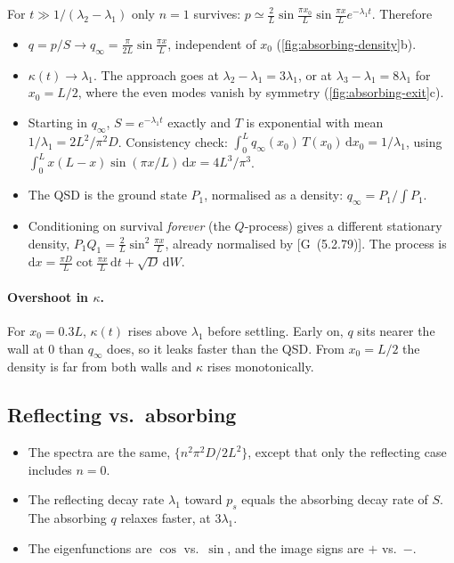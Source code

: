 \documentclass[11pt]{article}
\numberwithin{equation}{section}
\newcommand{\dd}{\mathrm{d}}
\newcommand{\G}[1]{[G~(#1)]}
\begin{document}
For $t\gg1/(\lambda_2-\lambda_1)$ only $n=1$ survives:
$p\simeq\frac2L\sin\frac{\pi x_0}{L}\sin\frac{\pi x}{L}e^{-\lambda_1t}$. Therefore
\begin{itemize}
  \item $q=p/S\to q_\infty=\frac{\pi}{2L}\sin\frac{\pi x}{L}$, independent of $x_0$ (\cref{fig:absorbing-density}b).
  \item $\kappa(t)\to\lambda_1$. The approach goes at $\lambda_2-\lambda_1=3\lambda_1$, or at
        $\lambda_3-\lambda_1=8\lambda_1$ for $x_0=L/2$, where the even modes vanish by symmetry
        (\cref{fig:absorbing-exit}c).
  \item Starting in $q_\infty$, $S=e^{-\lambda_1t}$ exactly and $T$ is exponential with mean
        $1/\lambda_1=2L^2/\pi^2D$. Consistency check:
        $\int_0^Lq_\infty(x_0)\,T(x_0)\,\dd x_0=1/\lambda_1$, using
        $\int_0^Lx(L-x)\sin(\pi x/L)\,\dd x=4L^3/\pi^3$.
  \item The QSD is the ground state $P_1$, normalised as a density: $q_\infty=P_1/\int P_1$.
  \item Conditioning on survival \emph{forever} (the $Q$-process) gives a different stationary density,
        $P_1Q_1=\frac2L\sin^2\frac{\pi x}{L}$, already normalised by \G{5.2.79}. The process is
        $\dd x=\frac{\pi D}{L}\cot\frac{\pi x}{L}\,\dd t+\sqrt D\,\dd W$.
\end{itemize}

\paragraph{Overshoot in $\kappa$.} For $x_0=0.3L$, $\kappa(t)$ rises above $\lambda_1$ before settling. Early on,
$q$ sits nearer the wall at $0$ than $q_\infty$ does, so it leaks faster than the QSD. From $x_0=L/2$ the
density is far from both walls and $\kappa$ rises monotonically.

\subsection{Reflecting vs.\ absorbing}

\begin{itemize}
  \item The spectra are the same, $\{n^2\pi^2D/2L^2\}$, except that only the reflecting case includes $n=0$.
  \item The reflecting decay rate $\lambda_1$ toward $p_s$ equals the absorbing decay rate of $S$. The
        absorbing $q$ relaxes faster, at $3\lambda_1$.
  \item The eigenfunctions are $\cos$ vs.\ $\sin$, and the image signs are $+$ vs.\ $-$.
\end{itemize}
\end{document}
